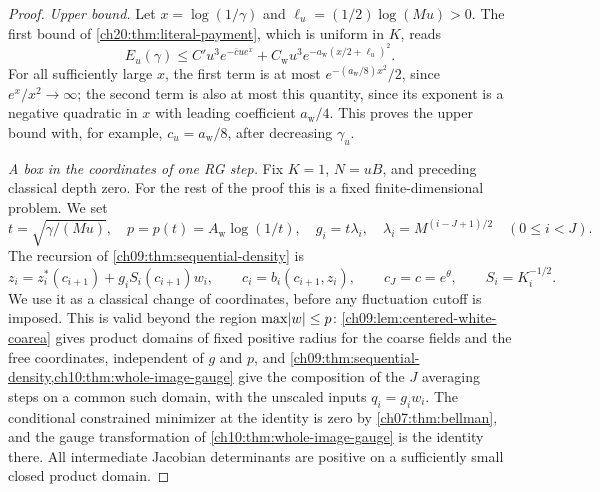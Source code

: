\begin{proof}
\emph{Upper bound.} Let $x=\log(1/\gamma)$ and $\ell_u=(1/2)\log(Mu)>0$. The first bound of \cref{ch20:thm:literal-payment}, which is uniform in $K$, reads
\[
 E_u(\gamma)\le C'u^3e^{-\bar cue^x}+C_{\mathrm w}u^3e^{-a_{\mathrm w}(x/2+\ell_u)^2}.
\]
For all sufficiently large $x$, the first term is at most $e^{-(a_{\mathrm w}/8)x^2}/2$, since $e^x/x^2\to\infty$; the second term is also at most this quantity, since its exponent is a negative quadratic in $x$ with leading coefficient $a_{\mathrm w}/4$. This proves the upper bound with, for example, $c_u=a_{\mathrm w}/8$, after decreasing $\gamma_u$.

\emph{A box in the coordinates of one RG step.} Fix $K=1$, $N=uB$, and preceding classical depth zero. For the rest of the proof this is a fixed finite-dimensional problem. We set
\[
 t=\sqrt{\gamma/(Mu)},\quad p=p(t)=A_{\mathrm w}\log(1/t),\quad
 g_i=t\lambda_i,\quad\lambda_i=M^{(i-J+1)/2}\quad(0\le i<J).
\]
The recursion of \cref{ch09:thm:sequential-density} is
\[
 z_i=z_i^*(c_{i+1})+g_iS_i(c_{i+1})w_i,\qquad c_i=b_i(c_{i+1},z_i),\qquad c_J=c=e^\theta,\qquad S_i=K_i^{-1/2}.
\]
We use it as a classical change of coordinates, before any fluctuation cutoff is imposed. This is valid beyond the region $\max\lvert w\rvert\le p$: \cref{ch09:lem:centered-white-coarea} gives product domains of fixed positive radius for the coarse fields and the free coordinates, independent of $g$ and $p$, and \cref{ch09:thm:sequential-density,ch10:thm:whole-image-gauge} give the composition of the $J$ averaging steps on a common such domain, with the unscaled inputs $q_i=g_iw_i$. The conditional constrained minimizer at the identity is zero by \cref{ch07:thm:bellman}, and the gauge transformation of \cref{ch10:thm:whole-image-gauge} is the identity there. All intermediate Jacobian determinants are positive on a sufficiently small closed product domain.


\end{proof}
